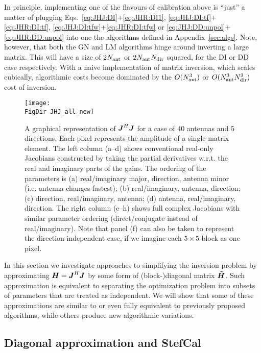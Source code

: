 \documentclass[useAMS,usenatbib]{mn2e}
\newcommand{\mat}[1]{{\bmath{#1}}}
\newcommand{\JJ}{\mat{J}} %
\newcommand{\HH}{\mat{H}} %
\newcommand{\HHa}{\mat{\tilde{H}}} %
\newcommand{\JHJ}{\JJ^H\JJ} %
\newcommand{\FigDir}{./}
\newcommand{\StefCal}{{\sc StefCal}}
\numberwithin{equation}{section} %
\begin{document}
In principle, implementing one of the flavours of calibration above is ``just'' a matter of  
plugging Eqs.~\ref{eq:JHJ:DI}+\ref{eq:JHR:DI1}, \ref{eq:JHJ:DI:tf}+\ref{eq:JHR:DI:tf},
\ref{eq:JHJ:DI:tfw}+\ref{eq:JHR:DI:tfw} or \ref{eq:JHJ:DD:unpol}+\ref{eq:JHR:DD:unpol} into one the 
algorithms defined in 
Appendix~\ref{sec:algs}. Note, however, that both the GN and LM algorithms hinge around 
inverting a large matrix. This will have a size of $2N_\mathrm{ant}$ or $2N_\mathrm{ant}N_\mathrm{dir}$ squared, 
for the DI or DD case respectively. With a naive implementation of matrix inversion, 
which scales cubically, algorithmic costs become dominated by the $O(N_\mathrm{ant}^3)$ or $O(N_\mathrm{ant}^3N_\mathrm{dir}^3)$
cost of inversion.


\begin{figure*}
\begin{center}
\texttt{[image: \\FigDir JHJ\_all\_new]}
\caption{\label{fig:JHJ}A graphical representation of $\JHJ$ for a case of 
40 antennas and 5 directions. Each pixel represents the amplitude of a single matrix element.
The left column (a--d) shows conventional real-only Jacobians constructed by taking the partial derivatives w.r.t. 
the real and imaginary parts of the gains. The ordering of the parameters is (a) real/imaginary major, 
direction, antenna minor (i.e. antenna changes fastest); (b) real/imaginary, antenna, direction; (c) direction, 
real/imaginary, antenna; (d) antenna, real/imaginary, direction. The right column (e--h) shows full complex Jacobians with similar parameter ordering (direct/conjugate instead of real/imaginary). Note that panel (f) can also be taken to represent the direction-independent case, if we imagine each $5\times5$ block as one pixel.}
\end{center}
\end{figure*}

In this section we investigate approaches to simplifying the inversion problem by approximating
$\HH=\JJ^H\JJ$ by some form of (block-)diagonal matrix $\HHa$. Such approximation is equivalent to separating
the optimization problem into subsets of parameters that are treated as independent. We will show 
that some of these approximations are similar to or even fully equivalent to previously proposed 
algorithms, while others produce new algorithmic variations.

\subsection{Diagonal approximation and \StefCal}
\label{sec:DI:stefcal}
\end{document}

